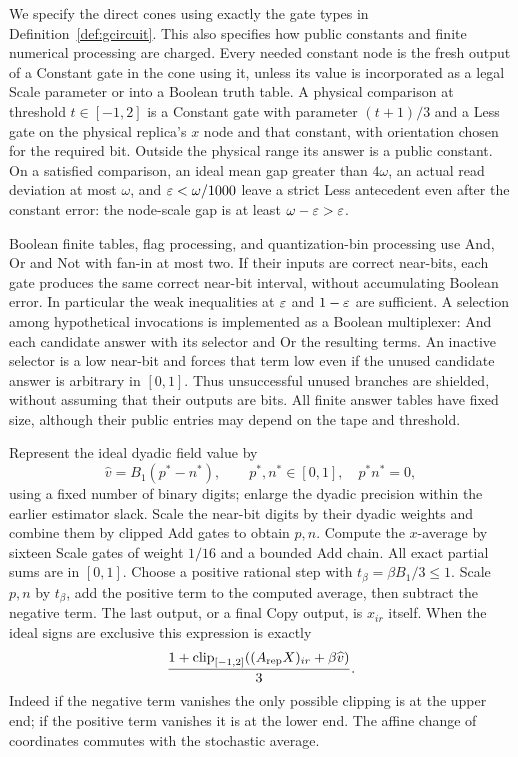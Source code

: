 We specify the direct cones using exactly the gate types in
Definition~\ref{def:gcircuit}. This also specifies how public constants
and finite numerical processing are charged. Every needed constant
node is the fresh output of a Constant gate in the cone using it, unless
its value is incorporated as a legal Scale parameter or into a Boolean
truth table. A physical comparison at threshold $t\in[-1,2]$ is a
Constant gate with parameter $(t+1)/3$ and a Less gate on the physical
replica's $x$ node and that constant, with orientation chosen for the
required bit. Outside the physical range its answer is a public
constant. On a satisfied comparison, an ideal mean gap greater than
$4\omega$, an actual read deviation at most $\omega$, and
$\varepsilon<\omega/1000$ leave a strict Less antecedent even after the
constant error: the node-scale gap is at least $\omega-\varepsilon>\varepsilon$.

Boolean finite tables, flag processing, and quantization-bin processing
use And, Or and Not with fan-in at most two. If their inputs are correct
near-bits, each gate produces the same correct near-bit interval,
without accumulating Boolean error. In particular the weak inequalities
at $\varepsilon$ and $1-\varepsilon$ are sufficient. A selection among hypothetical
invocations is implemented as a Boolean multiplexer: And each candidate
answer with its selector and Or the resulting terms. An inactive
selector is a low near-bit and forces that term low even if the unused
candidate answer is arbitrary in $[0,1]$. Thus unsuccessful unused
branches are shielded, without assuming that their outputs are bits.
All finite answer tables have fixed size, although their public entries
may depend on the tape and threshold.

Represent the ideal dyadic field value by
\begin{equation}\label{out:signed-value}
 \widehat v=B_1(p^*-n^*),\qquad
 p^*,n^*\in[0,1],\quad p^*n^*=0,
\end{equation}
using a fixed number of binary digits; enlarge the dyadic precision
within the earlier estimator slack. Scale the near-bit digits by their
dyadic weights and combine them by clipped Add gates to obtain $p,n$.
Compute the $x$-average by sixteen Scale gates of weight $1/16$ and a
bounded Add chain. All exact partial sums are in $[0,1]$. Choose a
positive rational step with
$t_\beta=\beta B_1/3\leq1$. Scale $p,n$ by $t_\beta$, add the positive
term to the computed average, then subtract the negative term. The last
output, or a final Copy output, is $x_{ir}$ itself. When the ideal signs
are exclusive this expression is exactly
\[
 \frac{1+\operatorname{clip}_{[-1,2]}((A_{\rm rep}X)_{ir}
                         +\beta\widehat v)}3.
\]
Indeed if the negative term vanishes the only possible clipping is at
the upper end; if the positive term vanishes it is at the lower end.
The affine change of coordinates commutes with the stochastic average.

